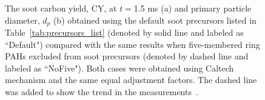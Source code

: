 \begin{figure}[H]
	\centering
	\caption{The soot carbon yield, CY, at $t=$1.5 ms (a) and primary particle diameter, $d_p$ (b) obtained using the default soot precursors listed in Table~\ref{tab:precursors_list} (denoted by solid line and labeled as ``Default") compared with the same results when five-membered ring PAHs  excluded from soot precursors (denoted by dashed line and labeled as ``NoFive"). Both cases were obtained using Caltech mechanism and the same equal adjustment factors. The dashed line was added to show the trend in the measurements~\citep{agafonov2016unified}.}
	\label{fig:shockagof_yieldspc_cpr} 
\end{figure}



